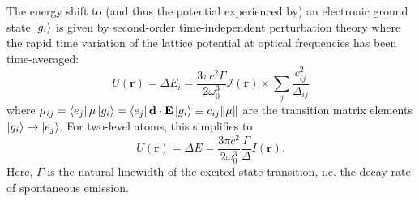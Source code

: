 \documentclass{book}
\theoremstyle{definition}
\newcommand{\I}{\mathcal{I}}
\newcommand{\f}[2]{\frac{#1}{#2}}
\begin{document}
The energy shift to (and thus the potential experienced by) an electronic ground state $\ket{g_i}$ is given by second-order time-independent perturbation theory where the rapid time variation of the lattice potential at optical frequencies has been time-averaged:
\begin{equation*}
U(\mathbf{r}) = \Delta E_i = \f{3\pi c^2 \Gamma}{2\omega_0^3}\I(\mathbf{r}) \times  \sum_j \f{c_{ij}^2}{\Delta_{ij}}
\end{equation*}
where $\mu_{ij} = \bra{e_j}\mu \ket{g_i}  = \bra{e_j} \mathbf{d}\cdot \mathbf{E} \ket{g_i} \equiv c_{ij}\norm{\mu}$ are the transition matrix elements $\ket{g_i} \to \ket{e_j}$. For two-level atoms, this simplifies to 
\begin{equation*}
U(\mathbf{r}) = \Delta E = \f{3\pi c^2}{2\omega_0^3}\f{\Gamma}{\Delta} I(\mathbf{r}).
\end{equation*}
Here, $\Gamma$ is the natural linewidth of the excited state transition, i.e. the decay rate of spontaneous emission. 
\end{document}
